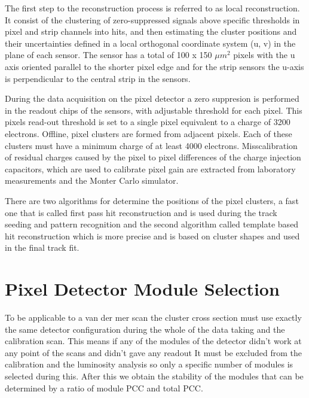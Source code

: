 The first step to the reconstruction process is referred to as local reconstruction. It consist of the clustering of zero-suppressed signals above specific thresholds in pixel and strip channels into hits, and then estimating the cluster positions and their uncertainties defined in a local orthogonal coordinate system (u, v) in the plane of each sensor. The sensor has a total of 100 x 150 $\mu m^{2}$ pixels with the u axis oriented parallel to the shorter pixel edge and for the strip sensors the u-axis is perpendicular to the central strip in the sensors.   \cite{cluster2}  

During the data acquisition on the pixel detector a zero suppresion is performed in the readout chips of the sensors, with adjustable threshold for each pixel. This pixels read-out threshold is set to a single pixel equivalent to a charge of 3200 electrons. Offline, pixel clusters are formed from adjacent pixels. Each of these clusters must have a minimum charge of at least 4000 electrons. Misscalibration of residual charges caused by the pixel to pixel differences of the charge injection capacitors, which are used to calibrate pixel gain are extracted from laboratory measurements and the Monter Carlo simulator. 

There are two algorithms for determine the positions of the pixel clusters, a fast one that is called first pass hit reconstruction and is used during the track seeding and pattern recognition and the second algorithm called template based hit reconstruction which is more precise and is based on cluster shapes and used in the final track fit. 


\section{Pixel Detector Module Selection}

To be applicable to a van der mer scan the cluster cross section must use exactly the same detector configuration during the whole of the data taking and the calibration scan. This means if any of the modules of the detector didn't work at any point of the scans and didn't gave any readout It must be excluded from the calibration and the luminosity analysis so only a specific number of modules is selected during this. After this we obtain the stability of the modules that can be determined by a ratio of module PCC and total PCC. \cite{PCC3}

